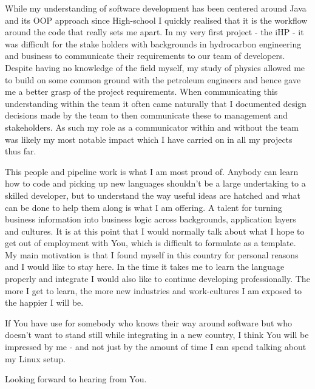\documentclass[paper=a4,fontsize=11pt]{scrartcl} %
\newcommand{\sepspace}{\vspace*{1em}}    %
\begin{document}
  \noindent  While my understanding of software development has been centered
  around Java and its OOP approach since High-school I quickly realised that it
  is the workflow around the code that really sets me apart. In my very first
  project - the iHP - it was difficult for the stake holders with backgrounds
  in hydrocarbon engineering and business to communicate their requirements to
  our team of developers.  Despite having no knowledge of the field myself, my
  study of physics allowed me to build on some common ground with the petroleum
  engineers and hence gave me a better grasp of the project requirements. When
  communicating this understanding within the team it often came naturally that
  I documented design decisions made by the team to then communicate these to
  management and stakeholders.  As such my role as a communicator within and
  without the team was likely my most notable impact which I have carried on in
  all my projects thus far.

  \sepspace

  \noindent  This people and pipeline work is what I am most proud of.  Anybody
  can learn how to code and picking up new languages shouldn't be a large
  undertaking to a skilled developer, but to understand the way useful ideas
  are hatched and what can be done to help them along is what I am offering.  A
  talent for turning business information into business logic across
  backgrounds, application layers and cultures.  It is at this point that I
  would normally talk about what I hope to get out of employment with You,
  which is difficult to formulate as a template.  My main motivation is that I
  found myself in this country for personal reasons and I would like to stay
  here.  In the time it takes me to learn the language properly and integrate I
  would also like to continue developing professionally.  The more I get to
  learn, the more new industries and work-cultures I am exposed to the happier
  I will be.

  \sepspace
  
  \noindent  If You have use for somebody who knows their way around software
  but who doesn't want to stand still while integrating in a new country, I
  think You will be impressed by me - and not just by the amount of time I can
  spend talking about my Linux setup.

  \sepspace

  \sepspace

  \noindent
  Looking forward to hearing from You.
\end{document}
